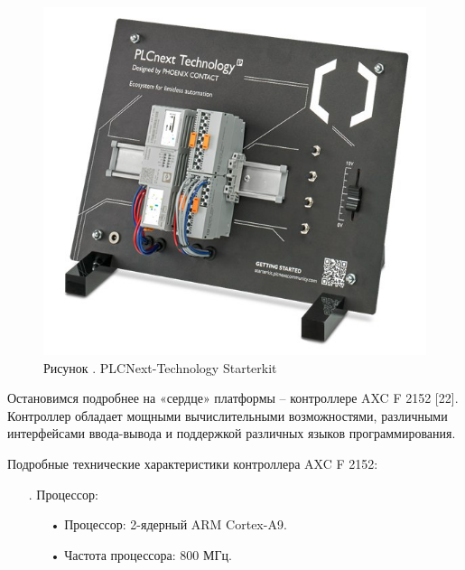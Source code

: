 {	
	\begin{figure}[H]
		\centering
		\def\svgwidth{\textwidth}
		\includegraphics[scale=0.8]{images/pclnext_x.jpg}
		\caption*{\gostFont Рисунок \thechaptercntr .\theimagecntr \spc {--} PLCNext-Technology Starterkit}
	\end{figure}  \addtocounter{imagecntr}{1}
	
	
	\par \redline Остановимся подробнее на «сердце» платформы – контроллере AXC F 2152 [22]. Контроллер обладает мощными вычислительными возможностями, различными интерфейсами ввода-вывода и поддержкой различных языков программирования.
	
	\par \redline Подробные технические характеристики контроллера AXC F 2152:
	
	\begin{itemize}[leftmargin=2.15cm, labelwidth=0.65cm, labelsep=0.0cm] 
		
		\item[\theitemcntr. ] Процессор:
		
		\begin{itemize}[leftmargin=1.5cm, labelwidth=0.65cm, labelsep=0.0cm] 
			
			\item[•] Процессор: 2-ядерный ARM Cortex-A9.
			
			\item[•] Частота процессора: 800 МГц.
			

\end{itemize}
\end{itemize}}
